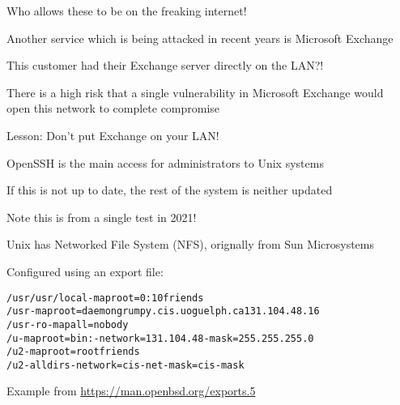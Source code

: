 \documentclass[Screen16to9,17pt]{foils}
\begin{document}
\begin{list2}
\item Who allows these to be on the freaking internet!
\end{list2}




Another service which is being attacked in recent years is Microsoft Exchange

This customer had their Exchange server directly on the LAN?!

\begin{list2}
\item There is a high risk that a single vulnerability in Microsoft Exchange would \\
open this network to complete compromise
\end{list2}




\begin{list2}
\item Lesson: Don't put Exchange on your LAN!
\end{list2}




\begin{list2}
\item OpenSSH is the main access for administrators to Unix systems
\item If this is not up to date, the rest of the system is neither updated
\item Note this is from a single test in 2021!
\end{list2}





Unix has Networked File System (NFS), orignally from Sun Microsystems

Configured using an export file:
\begin{alltt}\footnotesize
/usr /usr/local -maproot=0:10 friends
/usr -maproot=daemon grumpy.cis.uoguelph.ca 131.104.48.16
/usr -ro -mapall=nobody
/u -maproot=bin: -network=131.104.48 -mask=255.255.255.0
/u2 -maproot=root friends
/u2 -alldirs -network=cis-net -mask=cis-mask
\end{alltt}
Example from \url{https://man.openbsd.org/exports.5}
\end{document}
